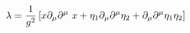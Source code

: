 \begin{equation}
\lambda={1\over
g^2}\left[x\partial_\mu\partial^\mu~x+\eta_1\partial_\mu\partial^\mu\eta_2+\partial_\mu\partial^\mu\eta_1\eta_2\right]
\end{equation}

